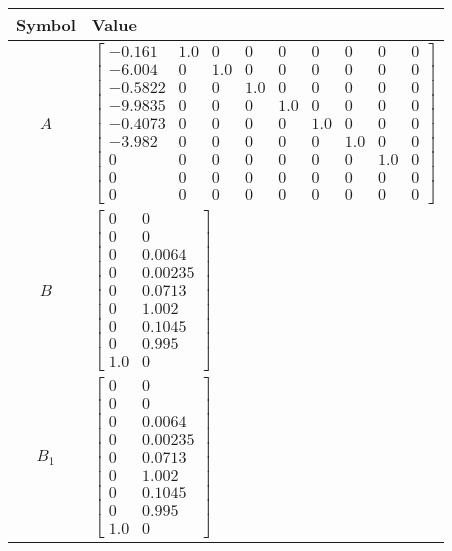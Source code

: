 \begin{tabular}{cl}
\hline
  Symbol  & Value                                                                                                                                                                                                                                                                                                                                                                                                             \\
\hline
   $A$    & $\left[\begin{matrix}-0.161 & 1.0 & 0 & 0 & 0 & 0 & 0 & 0 & 0\\-6.004 & 0 & 1.0 & 0 & 0 & 0 & 0 & 0 & 0\\-0.5822 & 0 & 0 & 1.0 & 0 & 0 & 0 & 0 & 0\\-9.9835 & 0 & 0 & 0 & 1.0 & 0 & 0 & 0 & 0\\-0.4073 & 0 & 0 & 0 & 0 & 1.0 & 0 & 0 & 0\\-3.982 & 0 & 0 & 0 & 0 & 0 & 1.0 & 0 & 0\\0 & 0 & 0 & 0 & 0 & 0 & 0 & 1.0 & 0\\0 & 0 & 0 & 0 & 0 & 0 & 0 & 0 & 0\\0 & 0 & 0 & 0 & 0 & 0 & 0 & 0 & 0\end{matrix}\right]$ \\
   $B$    & $\left[\begin{matrix}0 & 0\\0 & 0\\0 & 0.0064\\0 & 0.00235\\0 & 0.0713\\0 & 1.002\\0 & 0.1045\\0 & 0.995\\1.0 & 0\end{matrix}\right]$                                                                                                                                                                                                                                                                             \\
 $B_{1}$  & $\left[\begin{matrix}0 & 0\\0 & 0\\0 & 0.0064\\0 & 0.00235\\0 & 0.0713\\0 & 1.002\\0 & 0.1045\\0 & 0.995\\1.0 & 0\end{matrix}\right]$                                                                                                                                                                                                                                                                             \\

\end{tabular}
